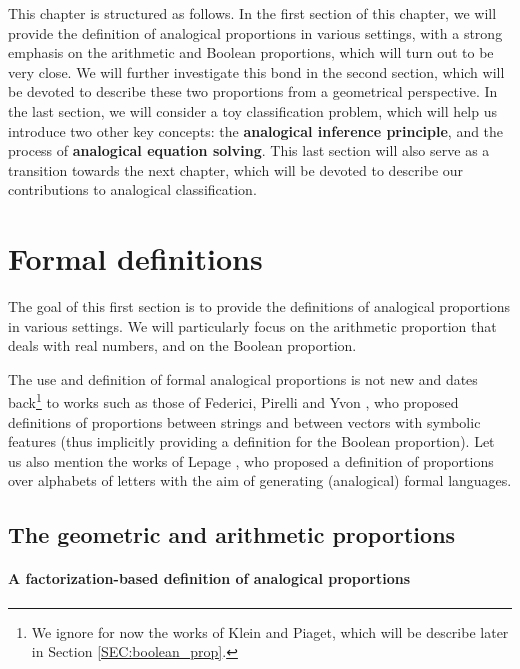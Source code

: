 This chapter is structured as follows. In the first section of this chapter, we
will provide the definition of analogical proportions in various settings, with
a strong emphasis on the arithmetic and Boolean proportions, which will turn
out to be very close. We will further investigate this bond in the second
section, which will be devoted to describe these two proportions from a
geometrical perspective. In the last section, we will consider a toy
classification problem, which will help us introduce two other key concepts:
the \textbf{analogical inference principle}, and the process of
\textbf{analogical equation solving}. This last section will also serve as a
transition towards the next chapter, which will be devoted to describe our
contributions to analogical classification.

\section{Formal definitions}
\label{SEC:formal_definitions_proportions}

The goal of this first section is to provide the definitions of analogical
proportions in various settings. We will particularly focus on the arithmetic
proportion that deals with real numbers, and on the Boolean proportion.

The use and definition of formal analogical proportions is not new and dates
back\footnote{We ignore for now the works of Klein and Piaget, which will be
describe later in Section \ref{SEC:boolean_prop}.} to works such as those of
Federici, Pirelli and Yvon \cite{FedPirYvo95, PirYvo99}, who proposed
definitions of proportions between strings and between vectors with symbolic
features (thus implicitly providing a definition for the Boolean proportion).
Let us also mention the works of Lepage \cite{Lep04}, who proposed a definition
of proportions over alphabets of letters with the aim of generating
(analogical) formal languages.

\subsection{The geometric and arithmetic proportions}

\paragraph{A factorization-based definition of analogical proportions\\}

